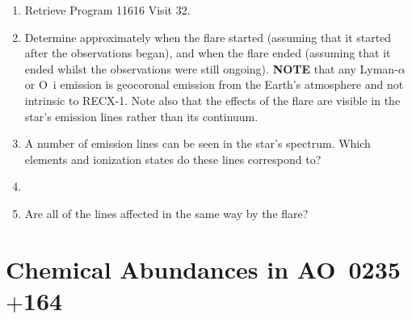 \begin{enumerate}
	\item Retrieve Program 11616 Visit 32.
	\item Determine approximately when the flare started (assuming that it started after the observations began),
		and when the flare ended (assuming that it ended whilst the observations were still ongoing). \textbf{NOTE} that any
		Lyman-$\alpha$ or O~{\sc i} emission is geocoronal emission from the Earth's atmosphere and not intrinsic to RECX-1. 
		Note also that the effects of the flare are visible in the star's emission lines rather than its continuum. {}
	\item A number of emission lines can be seen in the star's spectrum. Which elements and ionization states do these
		lines correspond to?
         \item {\color{red}{What are some common elements that produce emission lines that are seen in T-Tauri stars in the UV? At what wavelengths, if at all, do you see these in
                  RECX-1?}}
	\item Are all of the lines affected in the same way by the flare?
\end{enumerate}

\section{Chemical Abundances in AO~0235$+$164}

